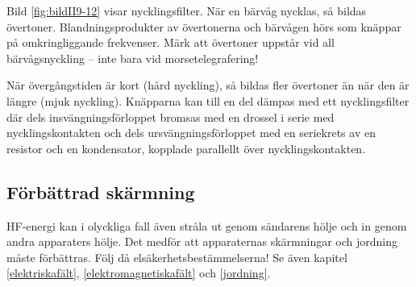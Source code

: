 Bild \ref{fig:bildII9-12} visar nycklingsfilter.
När en bärvåg nycklas, så bildas övertoner.
Blandningsprodukter av övertonerna och bärvågen hörs som knäppar på
omkringliggande frekvenser.
Märk att övertoner uppstår vid all bärvågsnyckling -- inte bara vid
morsetelegrafering!

När övergångstiden är kort (hård nyckling), så bildas fler övertoner
än när den är längre (mjuk nyckling).
Knäpparna kan till en del dämpas med ett nycklingsfilter där dels
insvängningsförloppet bromsas med en drossel i serie med nycklingskontakten och
dels ursvängningsförloppet med en seriekrets av en resistor och en kondensator,
kopplade parallellt över nycklingskontakten.


\subsection{Förbättrad skärmning}

HF-energi kan i olyckliga fall även stråla ut genom sändarens hölje
och in genom andra apparaters hölje.
Det medför att apparaternas skärmningar och jordning måste förbättras.
Följ då elsäkerhetsbestämmelserna!
Se även kapitel \ref{elektriskafält}, \ref{elektromagnetiskafält} och
\ref{jordning}.
